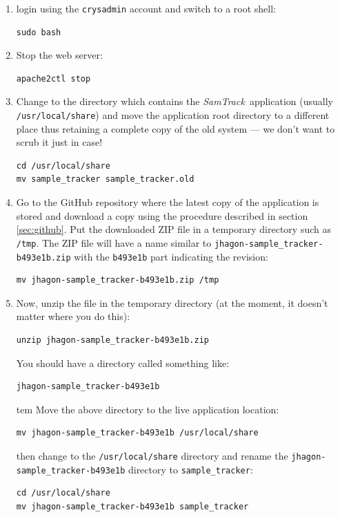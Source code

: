 \documentclass[12pt,twoside]{article}
\newcommand{\samtrack}{\emph{SamTrack}}
\begin{document}
\begin{enumerate}
\item
login using the \verb=crysadmin= account and switch to a root shell:
\begin{verbatim}
sudo bash
\end{verbatim}
\item
Stop the web server:
\begin{verbatim}
apache2ctl stop
\end{verbatim}
\item
Change to the directory which contains the \samtrack\ application 
(usually \verb=/usr/local/share=) and
move the application root directory to a different place thus retaining a
complete copy of the old system --- we don't want to scrub it just in case!
\begin{verbatim}
cd /usr/local/share
mv sample_tracker sample_tracker.old
\end{verbatim}
\item
Go to the GitHub repository where the latest copy of the application is stored
and download a copy using the procedure described in section
\ref{sec:github}. Put the downloaded ZIP file in a temporary directory
such as \verb=/tmp=. The ZIP file will have a name similar to
\verb=jhagon-sample_tracker-b493e1b.zip= with the \verb=b493e1b= part
indicating the revision:
\begin{verbatim}
mv jhagon-sample_tracker-b493e1b.zip /tmp
\end{verbatim}
\item
Now, unzip the file in the temporary directory 
(at the moment, it doesn't matter where you do this):
\begin{verbatim}
unzip jhagon-sample_tracker-b493e1b.zip
\end{verbatim}
You should have a directory called something like:
\begin{verbatim}
jhagon-sample_tracker-b493e1b
\end{verbatim}
tem
Move the above directory to the live application location:
\begin{verbatim}
mv jhagon-sample_tracker-b493e1b /usr/local/share
\end{verbatim}
then change to the \verb=/usr/local/share= directory and rename the\newline
\verb=jhagon-sample_tracker-b493e1b= directory to \verb=sample_tracker=:
\begin{verbatim}
cd /usr/local/share
mv jhagon-sample_tracker-b493e1b sample_tracker
\end{verbatim}

\end{enumerate}
\end{document}
